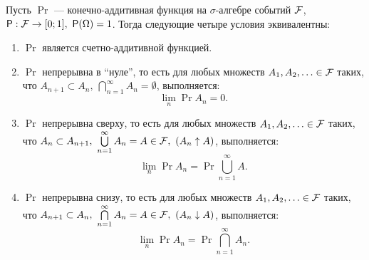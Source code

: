 \begin{theorem}
    Пусть $ \Pr $ --- конечно-аддитивная функция на $ \sigma $-алгебре событий $ \mathcal{F} $, \(\Pr: \F \to [0; 1],\ \Pr(\Omega) = 1 \). Тогда следующие четыре условия эквивалентны:
        \begin{enumerate}[label = (\alph*)]
            \item $ \Pr $ является счетно-аддитивной функцией.
            
            \item $ \Pr $ непрерывна в ``нуле'', то есть для любых множеств \(A_1, A_2, \ldots \in \mathcal{F} \) таких, что \(A_{n + 1} \subset A_n,\ \bigcap\limits_{n = 1}^{\infty}A_n = \emptyset \), выполняется:
            \[
                \lim\limits_{n}\Pr{A_n} = 0.
            \]  
            
            \item $ \Pr $ непрерывна сверху, то есть для любых множеств \(A_1, A_2, \ldots \in \mathcal{F} \) таких, что \(A_{n} \subset A_{n + 1},\ \bigcup\limits_{n = 1}^{\infty}A_n = A \in \mathcal{F},\  (A_n \uparrow A) \), выполняется:
            \[
            \lim\limits_{n}\Pr{A_n} = \Pr{\bigcup\limits_{n = 1}^{\infty}A}.
            \]  
            
            \item $ \Pr $ непрерывна снизу, то есть для любых множеств \(A_1, A_2, \ldots \in \mathcal{F} \) таких, что \(A_{n + 1} \subset A_{n},\ \bigcap\limits_{n = 1}^{\infty}A_n = A \in \mathcal{F},\  (A_n \downarrow A) \), выполняется:
            \[
            \lim\limits_{n}\Pr{A_n} = \Pr{\bigcap\limits_{n = 1}^{\infty}A_n}.
            \]  
            
        \end{enumerate}
\end{theorem}
